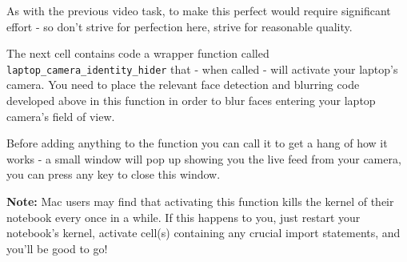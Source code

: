 \documentclass[11pt]{article}
\begin{document}
As with the previous video task, to make this perfect would require
significant effort - so don't strive for perfection here, strive for
reasonable quality.

The next cell contains code a wrapper function called
\texttt{laptop\_camera\_identity\_hider} that - when called - will
activate your laptop's camera. You need to place the relevant face
detection and blurring code developed above in this function in order to
blur faces entering your laptop camera's field of view.

Before adding anything to the function you can call it to get a hang of
how it works - a small window will pop up showing you the live feed from
your camera, you can press any key to close this window.

\textbf{Note:} Mac users may find that activating this function kills
the kernel of their notebook every once in a while. If this happens to
you, just restart your notebook's kernel, activate cell(s) containing
any crucial import statements, and you'll be good to go!
\end{document}
